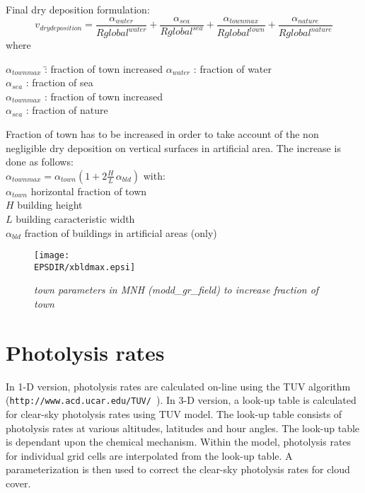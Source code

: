 Final dry deposition formulation:
$$
v_{dry deposition} = \frac{\alpha_{water}}{Rglobal^{water}} +
\frac{\alpha_{sea}}{Rglobal^{sea}} +
\frac{\alpha_{townmax}}{Rglobal^{town}} +
\frac{\alpha_{nature}}{Rglobal^{nature}}
$$
where\\ 
\begin{tabbing}
$\alpha_{townmax}$ \=: fraction of town increased \kill
$\alpha_{water}$ \> : fraction of water \\
$\alpha_{sea}$ \> : fraction of sea \\
$\alpha_{townmax}$ \> : fraction of town increased \\
$\alpha_{sea}$ \> : fraction of nature 
\end{tabbing}
Fraction of town has to be increased in order to take account of the non
negligible dry deposition on vertical surfaces in artificial
area. The increase is done as follows:\\
$\alpha_{townmax} = \alpha_{town} (1+2 \frac{H}{L} \, \alpha_{bld})$
with: \\
$\alpha_{town}$ horizontal fraction of town \\
$H$ building height \\
$L$ building caracteristic width \\
$\alpha_{bld}$ fraction of buildings in artificial areas (only)
\begin{figure}[hbp]
\begin{center}
\texttt{[image: \\EPSDIR/xbldmax.epsi]}
\end{center}
\label{bld}
\caption{\sl{town parameters in MNH (modd\_gr\_field) to increase
fraction of town}} 
\end{figure}

%
\section{Photolysis rates}
In 1-D version, photolysis rates are calculated on-line using the TUV algorithm 
\linebreak ({\tt http://www.acd.ucar.edu/TUV/ }). 
In 3-D version, a look-up table is calculated 
for clear-sky photolysis rates using TUV model. The look-up table consists 
of photolysis rates at various altitudes, latitudes and hour angles. 
The look-up table is dependant upon the chemical mechanism. 
Within the model, photolysis rates for individual grid cells are interpolated 
from the look-up table. A parameterization is then used to correct the 
clear-sky photolysis rates for cloud cover. 

